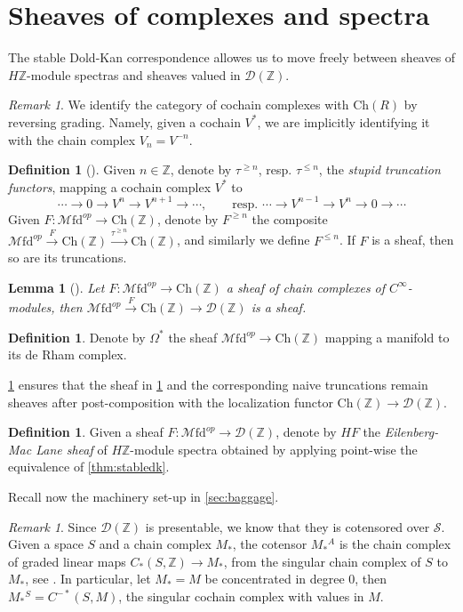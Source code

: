 \documentclass[10pt]{amsart}
\newcommand{\D}{\mathscr{D}}
\newcommand{\s}{\mathscr{S}}
\newcommand{\bZ}{\mathbb{Z}}
\newcommand{\Ch}{\mathrm{Ch}}
\newcommand{\Mfd}{\mathscr{M}\mathrm{fd}}
\newtheorem{lemma}[equation]{Lemma}
\theoremstyle{definition}
\newtheorem{definition}[equation]{Definition}
\theoremstyle{remark}
\newtheorem{remark}[equation]{Remark}
\numberwithin{equation}{section}
\begin{document}
\section{Sheaves of complexes and spectra}

The stable Dold-Kan correspondence allowes us to move freely between sheaves of $H\bZ$-module spectras and sheaves valued in $\D(\bZ)$.

\begin{remark}\label{rmk:identification}
  We identify the category of cochain complexes with $\Ch(R)$ by reversing grading. Namely, given a cochain $V^*$, we are implicitly identifying it with the chain complex $V_n=V^{-n}$. 
\end{remark}
\begin{definition}[{\cite[Definition 7.14]{bunkenikolausvoelkl2016diffcoh}}]Given $n\in\bZ$, denote by $\tau^{\geq n}$, resp. $\tau^{\leq n}$, the \emph{stupid truncation functors}, mapping a cochain complex $V^*$ to \[\cdots\to0\to V^n\to V^{n+1}\to\cdots, \qquad \mbox{resp. }\cdots\to V^{n-1}\to V^n\to0\to\cdots\]Given $F:\Mfd^{op}\to\Ch(\bZ)$, denote by $F^{\geq n}$ the composite $\Mfd^{op}\xrightarrow{F}\Ch(\bZ)\xrightarrow{\tau^{\geq n}}\Ch(\bZ)$, and similarly we define $F^{\leq n}$. If $F$ is a sheaf, then so are its truncations. 
\end{definition}
\begin{lemma}[{\cite[Lemma 7.12]{bunkenikolausvoelkl2016diffcoh}}]\label{lem:sheafloc}
  Let $F:\Mfd^{op}\to\Ch(\bZ)$ a sheaf of chain complexes of $C^\infty$-modules, then $\Mfd^{op}\xrightarrow{F}\Ch(\bZ)\to\D(\bZ)$ is a sheaf. 
\end{lemma}
\begin{definition}\label{def:forms}
  Denote by $\Omega^*$ the sheaf $\Mfd^{op}\to\Ch(\bZ)$ mapping a manifold to its de Rham complex. 
\end{definition}
\cref{lem:sheafloc} ensures that the sheaf in \cref{def:forms} and the corresponding naive truncations remain sheaves after post-composition with the localization functor $\Ch(\bZ)\to\D(\bZ)$.  
\begin{definition}\label{def:EMsheaf}
  Given a sheaf $F:\Mfd^{op}\to\D(\bZ)$, denote by $HF$ the \emph{Eilenberg-Mac Lane sheaf} of $H\bZ$-module spectra obtained by applying point-wise the equivalence of \cref{thm:stabledk}. 
\end{definition}
Recall now the machinery set-up in \cref{sec:baggage}.
\begin{remark}
  Since $\D(\bZ)$ is presentable, we know that they is cotensored over $\s$. Given a space $S$ and a chain complex $M_*$, the cotensor $M_*{}^A$ is the chain complex of graded linear maps $C_*(S,\bZ)\to M_*$, from the singular chain complex of $S$ to $M_*$, see \cite[Definition 1.3.2.1]{lurie2017ha}. In particular, let $M_*=M$ be concentrated in degree 0, then $M_*{}^S=C^{-*}(S,M)$, the singular cochain complex with values in $M$.
\end{remark}
\end{document}
